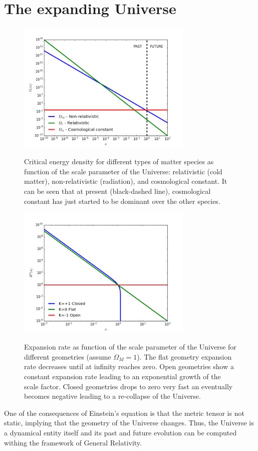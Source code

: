 \section{The expanding Universe}
\begin{figure}
\begin{center}
\includegraphics[width=0.75\textwidth]{./Pictures/rho_a.png}
\caption{Critical energy density for different types of matter species as function of the scale parameter of the Universe: relativistic (cold matter), non-relativistic (radiation), and cosmological constant. It can be seen that at present (black-dashed line), cosmological constant has just started to be dominant over the other species.}
\label{fig:rho_de}
\includegraphics[width=0.75\textwidth]{./Pictures/scale_factor.png}
\caption{Expansion rate as function of the scale parameter of the Universe for different geometries (assume $\Omega_M=1$). The flat geometry expansion rate decreases until at infinity reaches zero. Open geometries show a constant expansion rate leading to an exponential growth of the scale factor. Closed geometries drops to zero very fast an eventually becomes negative leading to a re-collapse of the Universe.}
\label{fig:scale_geometry}
\end{center}
\end{figure}
One of the consequences of Einstein's equation is that the metric tensor is not static, implying that the geometry of the Universe changes. Thus, the Universe is a dynamical entity itself and its past and future evolution can be computed withing the framework of General Relativity.
\newline

